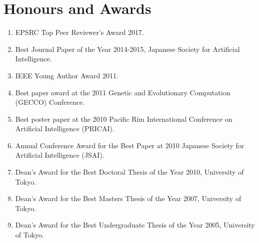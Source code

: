 \documentclass[a4paper,11pt]{article}
\begin{document}
\section{Honours and Awards}
\begin{enumerate}
\item EPSRC Top Peer Reviewer's Award 2017.
\item Best Journal Paper of the Year 2014-2015, Japanese Society for Artificial Intelligence.
\item IEEE Young Author Award 2011.
\item Best paper award at the 2011 Genetic and Evolutionary Computation (GECCO) Conference.
\item Best poster paper at the 2010 Pacific Rim International Conference on Artificial Intelligence (PRICAI).
\item Annual Conference Award for the Best Paper at 2010 Japanese Society for Artificial Intelligence (JSAI).
\item Dean’s Award for the Best Doctoral Thesis of the Year 2010, University of Tokyo.
\item Dean’s Award for the Best Masters Thesis of the Year 2007, University of Tokyo.
\item Dean’s Award for the Best Undergraduate Thesis of the Year 2005, University of Tokyo.
\end{enumerate}


\end{document}

